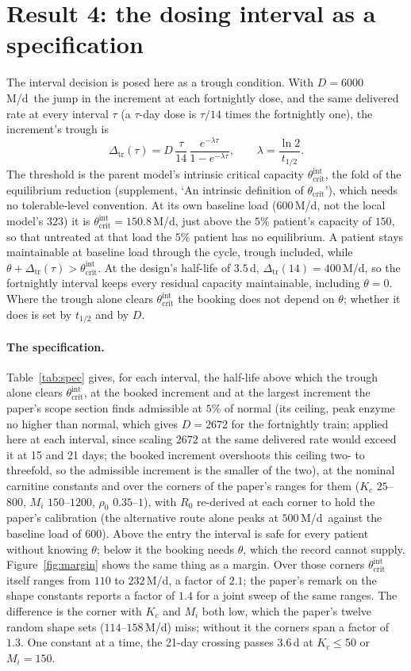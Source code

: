 \documentclass[11pt,a4paper]{article}
\newcommand{\thci}{\theta_{\mathrm{crit}}^{\mathrm{int}}}
\newcommand{\dtr}{\Delta_{\mathrm{tr}}}
\newcommand{\um}{\,\textmu M/d}
\begin{document}
\section{Result 4: the dosing interval as a specification}

The interval decision is posed here as a trough condition. With $D=6000$\um\ the jump in the
increment at each fortnightly dose, and the same delivered rate at every interval $\tau$ (a
$\tau$-day dose is $\tau/14$ times the fortnightly one), the increment's trough is
\begin{equation}
\dtr(\tau) = D\,\frac{\tau}{14}\,\frac{e^{-\lambda\tau}}{1-e^{-\lambda\tau}},\qquad
\lambda=\frac{\ln 2}{t_{1/2}}.
\end{equation}
The threshold is the parent model's intrinsic critical capacity $\thci$, the fold of the
equilibrium reduction (supplement, `An intrinsic definition of $\theta_{\mathrm{crit}}$'),
which needs no tolerable-level convention. At its own baseline load ($600$\um, not the local
model's $323$) it is $\thci=150.8$\um, just above the $5\%$ patient's capacity of $150$, so
that untreated at that load the $5\%$ patient has no equilibrium. A patient stays maintainable
at baseline load through the cycle, trough included, while $\theta+\dtr(\tau)>\thci$. At the
design's half-life of $3.5$\,d, $\dtr(14)=400$\um, so the fortnightly interval keeps every
residual capacity maintainable, including $\theta=0$. Where the trough alone clears $\thci$
the booking does not depend on $\theta$; whether it does is set by $t_{1/2}$ and by $D$.

\paragraph{The specification.} Table~\ref{tab:spec} gives, for each interval, the half-life
above which the trough alone clears $\thci$, at the booked increment and at the largest
increment the paper's scope section finds admissible at $5\%$ of normal (its ceiling, peak enzyme
no higher than normal, which gives $D=2672$ for the fortnightly train; applied here at each
interval, since scaling $2672$ at the same delivered rate would exceed it at 15 and 21 days; the
booked increment overshoots this ceiling two- to threefold, so the admissible increment is the
smaller of the two), at the
nominal
carnitine constants and over the corners of the paper's ranges for them ($K_c$
$25$--$800$, $M_i$ $150$--$1200$, $\rho_0$ $0.35$--$1$), with $R_0$ re-derived at each corner to
hold the paper's calibration (the alternative route alone peaks at $500$\um\ against the
baseline load of $600$). Above the entry the interval is safe
for every patient without knowing $\theta$; below it the booking needs $\theta$, which the
record cannot supply. Figure~\ref{fig:margin} shows the same thing as a margin. Over those
corners $\thci$ itself ranges from $110$ to $232$\um, a factor of $2.1$; the paper's remark on
the shape constants reports a factor of $1.4$ for a joint sweep of the same ranges. The
difference is the corner with $K_c$ and $M_i$ both low, which the paper's twelve random shape
sets ($114$--$158$\um) miss; without it the corners span a factor of $1.3$. One constant at a time, the 21-day crossing passes $3.6$\,d at $K_c\le50$ or
$M_i=150$.
\end{document}
